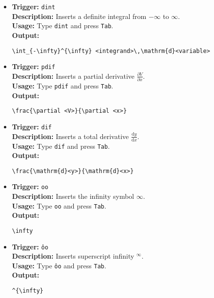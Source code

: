 \documentclass{article}
\begin{document}
\begin{itemize}[leftmargin=*, label={}]
\item \textbf{Trigger:} \texttt{dint} \\
\textbf{Description:} Inserts a definite integral from \(-\infty\) to \(\infty\). \\
\textbf{Usage:} Type \texttt{dint} and press \texttt{Tab}. \\
\textbf{Output:}
\begin{verbatim}
\int_{-\infty}^{\infty} <integrand>\,\mathrm{d}<variable>
\end{verbatim}

\item \textbf{Trigger:} \texttt{pdif} \\
\textbf{Description:} Inserts a partial derivative \(\frac{\partial V}{\partial x}\). \\
\textbf{Usage:} Type \texttt{pdif} and press \texttt{Tab}. \\
\textbf{Output:}
\begin{verbatim}
\frac{\partial <V>}{\partial <x>}
\end{verbatim}

\item \textbf{Trigger:} \texttt{dif} \\
\textbf{Description:} Inserts a total derivative \(\frac{\mathrm{d}y}{\mathrm{d}x}\). \\
\textbf{Usage:} Type \texttt{dif} and press \texttt{Tab}. \\
\textbf{Output:}
\begin{verbatim}
\frac{\mathrm{d}<y>}{\mathrm{d}<x>}
\end{verbatim}

\item \textbf{Trigger:} \texttt{oo} \\
\textbf{Description:} Inserts the infinity symbol \(\infty\). \\
\textbf{Usage:} Type \texttt{oo} and press \texttt{Tab}. \\
\textbf{Output:}
\begin{verbatim}
\infty
\end{verbatim}

\item \textbf{Trigger:} \texttt{\^oo} \\
\textbf{Description:} Inserts superscript infinity \(^{\infty}\). \\
\textbf{Usage:} Type \texttt{\^oo} and press \texttt{Tab}. \\
\textbf{Output:}
\begin{verbatim}
^{\infty}
\end{verbatim}


\end{itemize}
\end{document}
